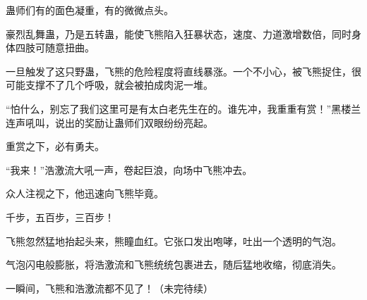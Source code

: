 \begin{this_body}
蛊师们有的面色凝重，有的微微点头。

豪烈乱舞蛊，乃是五转蛊，能使飞熊陷入狂暴状态，速度、力道激增数倍，同时身体四肢可随意扭曲。

一旦触发了这只野蛊，飞熊的危险程度将直线暴涨。一个不小心，被飞熊捉住，很可能支撑不了几个呼吸，就会被拍成肉泥一堆。

“怕什么，别忘了我们这里可是有太白老先生在的。谁先冲，我重重有赏！”黑楼兰连声吼叫，说出的奖励让蛊师们双眼纷纷亮起。

重赏之下，必有勇夫。

“我来！”浩激流大吼一声，卷起巨浪，向场中飞熊冲去。

众人注视之下，他迅速向飞熊毕竟。

千步，五百步，三百步！

飞熊忽然猛地抬起头来，熊瞳血红。它张口发出咆哮，吐出一个透明的气泡。

气泡闪电般膨胀，将浩激流和飞熊统统包裹进去，随后猛地收缩，彻底消失。

一瞬间，飞熊和浩激流都不见了！（未完待续）

\end{this_body}

